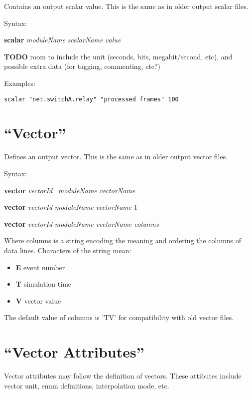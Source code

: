 Contains an output scalar value. This is the same as in older output
scalar files.

Syntax:

\hspace{20mm} \textbf{scalar} \textit{moduleName} \textit{scalarName} \textit{value}

\textbf{TODO} room to include the unit (seconds, bits, megabit/second,
etc), and possible extra data (for tagging, commenting, etc?)

Examples:

\begin{verbatim}
scalar "net.switchA.relay" "processed frames" 100
\end{verbatim}

\section{``Vector''}

Defines an output vector. This is the same as in older output vector
files.

Syntax:

\hspace{20mm} \textbf{vector} \textit{vectorId} \ \textit{moduleName} \textit{vectorName}

\hspace{20mm} \textbf{vector} \textit{vectorId} \textit{moduleName} \textit{vectorName} 1

\hspace{20mm} \textbf{vector }\textit{vectorId} \textit{moduleName vectorName columns}

Where columns is a string encoding the meaning and ordering
the columns of data lines. Characters of the string mean:

\begin{itemize}
  \item \textbf{E} event number
  \item \textbf{T} simulation time
  \item \textbf{V} vector value
\end{itemize}

The default value of columns is 'TV' for compatibility with old vector files.


\section{``Vector Attributes''}

Vector attributes may follow the definition of vectors. These attibutes
include vector unit, enum definitions, interpolation mode, etc.

